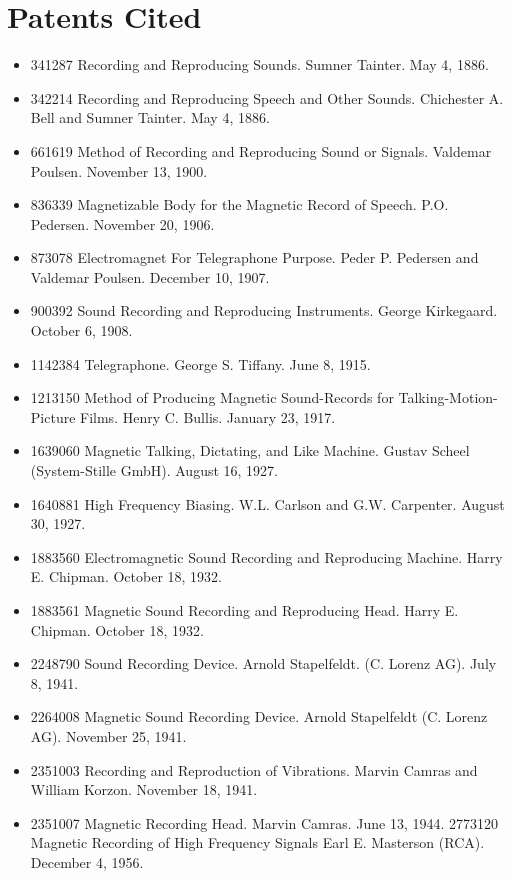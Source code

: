 \documentclass[UKenglish]{ifimaster}  %
\begin{document}
\chapter{Patents Cited}

\begin{itemize}
\item 341287 Recording and Reproducing Sounds.  Sumner Tainter.  May 4, 1886.
\item 342214 Recording and Reproducing Speech and Other Sounds.  Chichester A. Bell and Sumner Tainter.  May 4, 1886.
\item 661619 Method of Recording and Reproducing Sound or Signals.  Valdemar Poulsen.  November 13, 1900.
\item 836339 Magnetizable Body for the Magnetic Record of Speech.  P.O. Pedersen.  November 20, 1906.
\item 873078 Electromagnet For Telegraphone Purpose.  Peder P. Pedersen and Valdemar Poulsen.  December 10, 1907.
\item 900392 Sound Recording and Reproducing Instruments.  George Kirkegaard.  October 6, 1908.
\item 1142384 Telegraphone. George S. Tiffany.  June 8, 1915.
\item 1213150 Method of Producing Magnetic Sound-Records for Talking-Motion-Picture Films. Henry C. Bullis.  January 23, 1917.
\item 1639060 Magnetic Talking, Dictating, and Like Machine. Gustav Scheel (System-Stille GmbH).  August 16, 1927.
\item 1640881 High Frequency Biasing. W.L. Carlson and G.W. Carpenter.  August 30, 1927.
\item 1883560 Electromagnetic Sound Recording and Reproducing Machine. Harry E. Chipman.  October 18, 1932.
\item 1883561 Magnetic Sound Recording and Reproducing Head. Harry E. Chipman.  October 18, 1932.
\item 2248790 Sound Recording Device. Arnold Stapelfeldt. (C. Lorenz AG).  July 8, 1941.
\item 2264008 Magnetic Sound Recording Device. Arnold Stapelfeldt (C. Lorenz AG).  November 25, 1941.
\item 2351003 Recording and Reproduction of Vibrations. Marvin Camras and William Korzon.  November 18, 1941.
\item 2351007 Magnetic Recording Head. Marvin Camras. June 13, 1944. 2773120 Magnetic Recording of High Frequency Signals Earl E. Masterson (RCA).  December 4, 1956.

\end{itemize}
\end{document}
